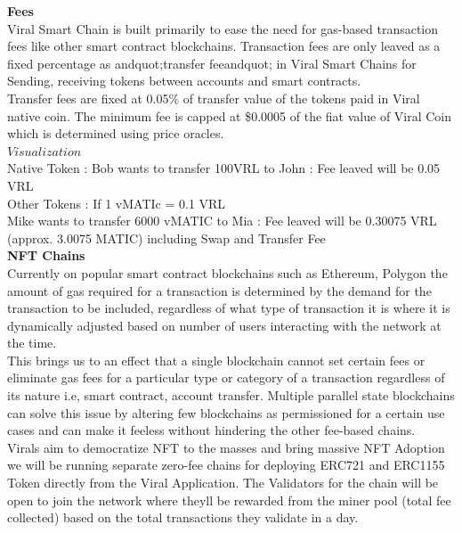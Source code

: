 \documentclass[10pt]{article}
\begin{document}
\textbf{Fees}\\

Viral Smart Chain is built primarily to ease the need for gas-based transaction fees like other smart contract blockchains. Transaction fees are only leaved as a fixed percentage as andquot;transfer feeandquot; in Viral Smart Chains for Sending, receiving tokens between accounts and smart contracts.\\

Transfer fees are fixed at 0.05\% of transfer value of the tokens paid in Viral native coin. The minimum fee is capped at \$0.0005 of the fiat value of Viral Coin which is determined using price oracles.\\

$Visualization$\\

Native Token : Bob wants to transfer 100VRL to John : Fee leaved will be 0.05 VRL\\

Other Tokens : If 1 vMATIc = 0.1 VRL\\

Mike wants to transfer 6000 vMATIC to Mia : Fee leaved will be 0.30075 VRL (approx. 3.0075 MATIC) including Swap and Transfer Fee\\

\textbf{NFT Chains}\\

Currently on popular smart contract blockchains such as Ethereum, Polygon the amount of gas required for a transaction is determined by the demand for the transaction to be included, regardless of what type of transaction it is where it is dynamically adjusted based on number of user\textsc{}s interacting with the network at the time.\\

This brings us to an effect that a single blockchain cannot set certain fees or eliminate gas fees for a particular type or category of a transaction regardless of it\textsc{}s nature i.e, smart contract, account transfer. Multiple parallel state blockchains can solve this issue by altering few blockchains as permissioned for a certain use cases and can make it feeless without hindering the other fee-based chains.\\

Viral\textsc{}s aim to democratize NFT to the masses and bring massive NFT Adoption we will be running separate zero-fee chains for deploying ERC721 and ERC1155 Token directly from the Viral Application. The Validators for the chain will be open to join the network where they\textsc{}ll be rewarded from the miner pool (total fee collected) based on the total transactions they validate in a day.\\
\end{document}
